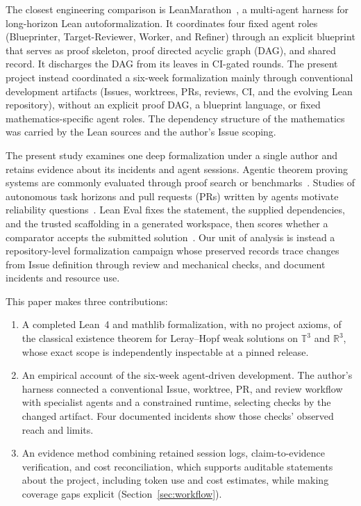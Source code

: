 The closest engineering comparison is
LeanMarathon~\cite{zhang2026leanmarathon}, a multi-agent harness for
long-horizon Lean autoformalization. It coordinates four fixed agent
roles (Blueprinter, Target-Reviewer, Worker, and Refiner) through an
explicit blueprint that serves as proof skeleton, proof directed acyclic
graph (DAG), and shared record. It discharges the DAG from its leaves in
CI-gated rounds. The present project instead coordinated a six-week
formalization mainly through conventional development artifacts (Issues,
worktrees, PRs, reviews, CI, and the evolving Lean repository), without
an explicit proof DAG, a blueprint language, or fixed mathematics-specific
agent roles. The dependency structure of the mathematics was carried by
the Lean sources and the author's Issue scoping.

The present study examines one deep formalization under a single
author and retains evidence about its incidents and agent sessions.
Agentic theorem proving systems are commonly evaluated through proof
search or benchmarks~\cite{yang2023leandojo,
deepmind2025alphaproof}. Studies of autonomous task
horizons and pull requests (PRs) written by agents motivate reliability
questions~\cite{metr2025longtasks,agenticprs2026security}.
Lean Eval fixes the statement, the supplied dependencies, and the trusted
scaffolding in a generated workspace, then scores whether a comparator
accepts the submitted solution~\cite{leaneval2026repo,
leaneval2026site}. %
Our unit of analysis is instead a repository-level formalization
campaign whose preserved records trace changes from Issue definition
through review and mechanical checks, and document incidents and
resource use.

This paper makes three contributions:
\begin{enumerate}
\item A completed Lean~4 and mathlib formalization, with no project
  axioms, of the classical existence theorem for Leray--Hopf weak
  solutions on $\mathbb{T}^3$ and $\mathbb{R}^3$, whose exact scope is
  independently inspectable at a pinned release.
\item An empirical account of the six-week agent-driven development. The
  author's harness connected a conventional Issue, worktree, PR, and
  review workflow with specialist agents and a constrained runtime,
  selecting checks by the changed artifact. Four documented incidents show
  those checks' observed reach and limits.
\item An evidence method combining retained session logs, claim-to-evidence
  verification, and cost reconciliation, which supports auditable
  statements about the project, including token use and cost estimates,
  while making coverage gaps explicit
  (Section~\ref{sec:workflow}).
\end{enumerate}


